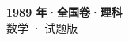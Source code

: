 \documentclass[zihao=-4, a4paper]{ctexart}
\begin{document}
\begin{center}
  {\Large\bfseries 1989 年·全国卷·理科}\\[4pt]
  {\large 数学 · 试题版}
\end{center}
\medskip
{}

\end{document}
